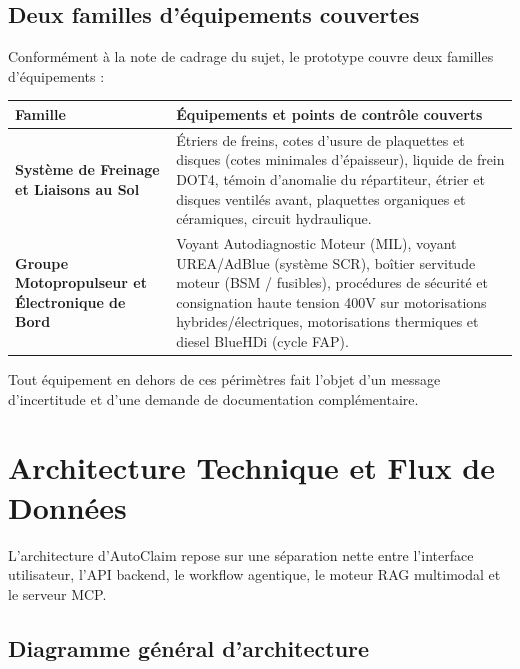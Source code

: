 \documentclass[11pt,a4paper]{article}
\begin{document}
\subsection{Deux familles d'équipements couvertes}
Conformément à la note de cadrage du sujet, le prototype couvre deux familles d'équipements :

\begin{tabularx}{\textwidth}{>{\bfseries}l X}
\toprule
Famille & Équipements et points de contrôle couverts \\
\midrule
Système de Freinage et Liaisons au Sol &
Étriers de freins, cotes d'usure de plaquettes et disques (cotes minimales d'épaisseur), liquide de frein DOT4, témoin d'anomalie du répartiteur, étrier et disques ventilés avant, plaquettes organiques et céramiques, circuit hydraulique. \\
Groupe Motopropulseur et Électronique de Bord &
Voyant Autodiagnostic Moteur (MIL), voyant UREA/AdBlue (système SCR), boîtier servitude moteur (BSM / fusibles), procédures de sécurité et consignation haute tension 400V sur motorisations hybrides/électriques, motorisations thermiques et diesel BlueHDi (cycle FAP). \\
\bottomrule
\end{tabularx}

Tout équipement en dehors de ces périmètres fait l'objet d'un message d'incertitude et d'une demande de documentation complémentaire.

\section{Architecture Technique et Flux de Données}

L'architecture d'AutoClaim repose sur une séparation nette entre l'interface utilisateur, l'API backend, le workflow agentique, le moteur RAG multimodal et le serveur MCP.

\subsection{Diagramme général d'architecture}
\end{document}
